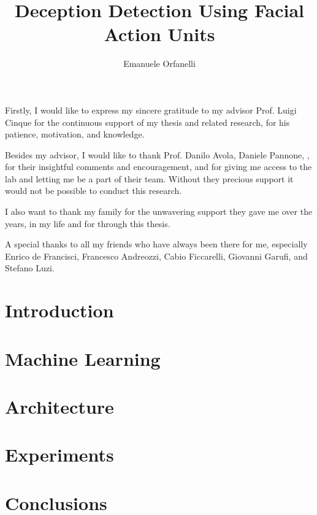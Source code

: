 \documentclass[LaM,binding=0.6cm,english,noexaminfo]{sapthesis}
\title{Deception Detection Using Facial Action Units}
\author{Emanuele Orfanelli}
\begin{document}
\frontmatter

\maketitle

\dedication{Dedicated to\\ my Family and Friends}

\begin{acknowledgments}
Firstly, I would like to express my sincere gratitude to my advisor Prof. Luigi Cinque for the continuous support of my thesis and related research, for his patience, motivation, and knowledge. 

Besides my advisor, I would like to thank Prof. Danilo Avola, Daniele Pannone, , for their insightful comments and encouragement, and for giving me access to the lab and letting me be a part of their team. Without they precious support it would not be possible to conduct this research.

I also want to thank my family for the unwavering support they gave me over the years, in my life and for through this thesis.

A special thanks to all my friends who have always been there for me, especially Enrico de Francisci, Francesco Andreozzi, Cabio Ficcarelli, Giovanni Garufi, and Stefano Luzi.
\end{acknowledgments}

\tableofcontents



\mainmatter

\chapter{Introduction}


\chapter{Machine Learning} \label{tit:ml}


\chapter{Architecture} \label{tit:archi}


\chapter{Experiments} \label{tit:exp}


\chapter{Conclusions}  \label{tit:concl}


\backmatter

\printbibliography

\listoffigures

\cleardoublepage
\end{document}
